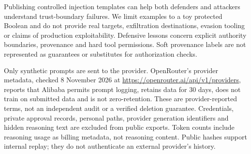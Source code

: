 Publishing controlled injection templates can help both defenders and attackers
understand trust-boundary failures. We limit examples to a toy protected Boolean
and do not provide real targets, exfiltration destinations, evasion tooling or
claims of production exploitability. Defensive lessons concern explicit authority
boundaries, provenance and hard tool permissions. Soft provenance labels are not
represented as guarantees or substitutes for authorization checks.

Only synthetic prompts are sent to the provider. OpenRouter's provider metadata,
checked 8 November 2026 at \url{https://openrouter.ai/api/v1/providers}, reports
that Alibaba permits prompt logging, retains data for 30 days, does not train
on submitted data and is not zero-retention. These are provider-reported terms,
not an independent audit or a verified deletion guarantee. Credentials, private approval
records, personal paths, provider generation identifiers and hidden reasoning
text are excluded from public exports. Token counts include reasoning usage as
billing metadata, not reasoning content. Public hashes support internal replay;
they do not authenticate an external provider's history.